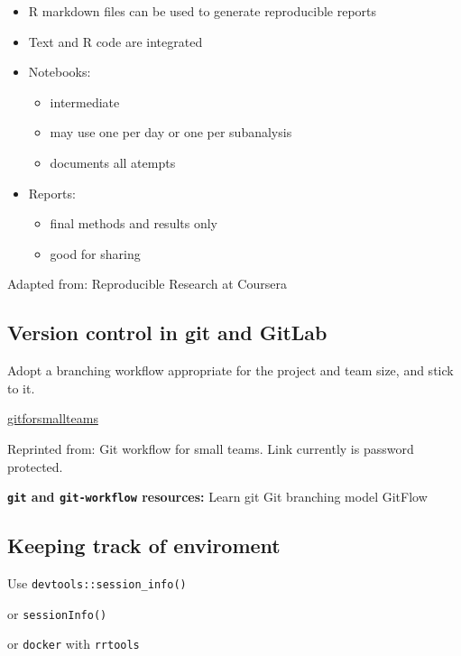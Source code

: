 \documentclass[openany]{book}
\providecommand{\tightlist}{%
  \setlength{\itemsep}{0pt}\setlength{\parskip}{0pt}}
\begin{document}
\begin{itemize}
\item
  R markdown files can be used to generate reproducible reports
\item
  Text and R code are integrated
\item
  Notebooks:

  \begin{itemize}
  \tightlist
  \item
    intermediate
  \item
    may use one per day or one per subanalysis
  \item
    documents all atempts
  \end{itemize}
\item
  Reports:

  \begin{itemize}
  \tightlist
  \item
    final methods and results only
  \item
    good for sharing
  \end{itemize}
\end{itemize}

Adapted from: Reproducible Research at Coursera

\hypertarget{version-control-in-git-and-gitlab}{%
\subsection{Version control in git and GitLab}\label{version-control-in-git-and-gitlab}}

Adopt a branching workflow appropriate for the project and team size, and stick to it.

\url{gitforsmallteams}

Reprinted from: Git workflow for small teams. Link currently is password protected.

\textbf{\texttt{git} and \texttt{git-workflow} resources:}
Learn git
Git branching model
GitFlow

\hypertarget{keeping-track-of-enviroment}{%
\subsection{Keeping track of enviroment}\label{keeping-track-of-enviroment}}

Use \texttt{devtools::session\_info()}

or \texttt{sessionInfo()}

or \texttt{docker} with \texttt{rrtools}
\end{document}
